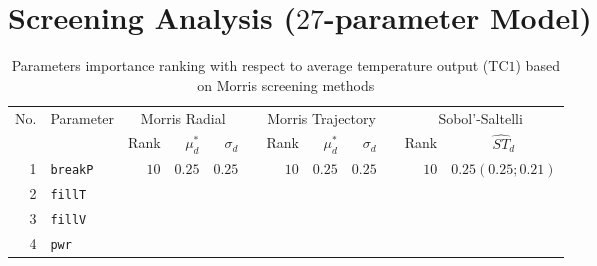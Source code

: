 \section{Screening Analysis ($27$-parameter Model)}\label{app:tbl_results_screening}

\begin{table*}[!htbp]\centering
{}
\caption{Parameters importance ranking with respect to average temperature output (TC$1$) based on Morris screening methods}
\begin{tabular}{@{}rlrrrrrrrrrc@{}}\toprule
\multirow{2}{*}{\footnotesize{No.}} & \multirow{2}{*}{\footnotesize{Parameter}} & \multicolumn{3}{c}{\footnotesize{Morris Radial}} & \phantom{a} & \multicolumn{3}{c}{\footnotesize{Morris Trajectory}}  &\phantom{a}& \multicolumn{2}{c}{\footnotesize{Sobol'-Saltelli}} \\             
                                                    \cmidrule{3-5}                            \cmidrule{7-9} \cmidrule{11-12}
    &                                             & \footnotesize{Rank}   & $\mu^*_d$ & $\sigma_d$   &             & \footnotesize{Rank} & $\mu^*_d$ & $\sigma_d$          &           & \footnotesize{Rank} & \footnotesize{$\hat{ST}_d$}\\ \midrule
\footnotesize{1}   & \footnotesize{\texttt{breakP}} & \footnotesize{$10$} & \footnotesize{$0.25$} &  \footnotesize{$0.25$}  & & \footnotesize{$10$}    & \footnotesize{$0.25$}     & \footnotesize{$0.25$} &          & \footnotesize{$10$}    &   \footnotesize{$0.25 (0.25;0.21)$}   \\
\footnotesize{2}   & \footnotesize{\texttt{fillT}}     	&          &          &          &          &     &     & &          &     &      \\
\footnotesize{3}   & \footnotesize{\texttt{fillV}}     	&          &          &          &          &     &     & &          &     &      \\
\footnotesize{4}   & \footnotesize{\texttt{pwr}}       	&          &          &          &          &     &     & &          &     &     \\

\end{tabular}
\end{table*}

